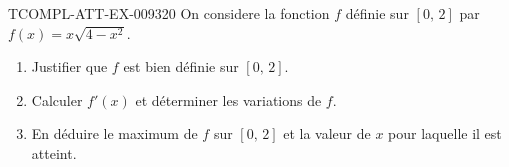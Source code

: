 \begin{exercice}{TCOMPL-ATT-EX-009}{3}{20}
On considere la fonction $f$ définie sur $[0,\, 2]$ par $f(x) = x\sqrt{4 - x^2}$.
\begin{enumerate}
  \item Justifier que $f$ est bien définie sur $[0,\, 2]$.
  \item Calculer $f'(x)$ et déterminer les variations de $f$.
  \item En déduire le maximum de $f$ sur $[0,\, 2]$ et la valeur de $x$ pour laquelle il est atteint.
\end{enumerate}

\end{exercice}
